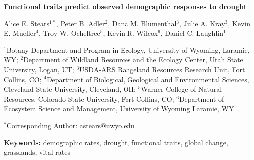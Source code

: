 \documentclass[12pt, letterpaper]{article}
\begin{document}
\begin{flushleft}
\Large{\textbf{Functional traits predict observed demographic responses to drought}} 

\normalsize{Alice E. Stears$^{1*}$, Peter B. Adler$^2$, Dana M. Blumenthal$^3$, Julie A. Kray$^3$, Kevin E. Mueller$^4$, Troy W. Ocheltree$^5$, Kevin R. Wilcox$^6$, Daniel C. Laughlin$^1$}

\small{$^1$Botany Department and Program in Ecology, University of Wyoming, Laramie, WY; \linebreak
$^2$Department of Wildland Resources and the Ecology Center, Utah State University, Logan, UT; \linebreak
$^3$USDA-ARS Rangeland Resources Research Unit, Fort Collins, CO; \linebreak
$^4$Department of Biological, Geological and Environmental Sciences, Cleveland State University, Cleveland, OH; \linebreak
$^5$Warner College of Natural Resources, Colorado State University, Fort Collins, CO; \linebreak
$^6$Department of Ecosystem Science and Management, University of Wyoming Laramie, WY}\linebreak

\small{$^*$Corresponding Author: astears@uwyo.edu}

\end{flushleft}
\textbf{Keywords:} demographic rates, drought, functional traits, global change, grasslands, vital rates
\end{document}
